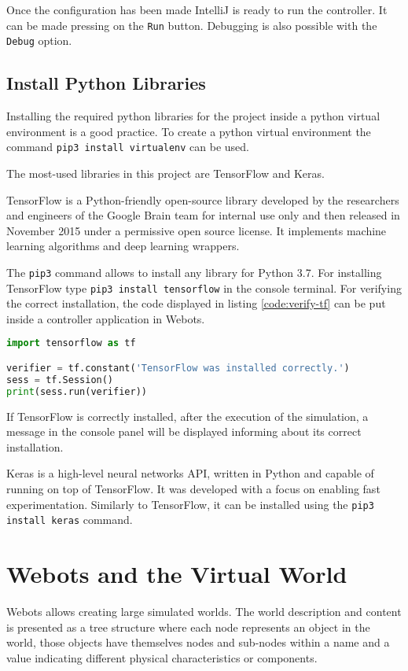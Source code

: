 Once the configuration has been made IntelliJ is ready to run the controller. It can be made pressing on the \verb|Run| button. Debugging is also possible with the \verb|Debug| option.

\subsection{Install Python Libraries}

Installing the required python libraries for the project inside a python virtual environment is a good practice. To create a python virtual environment the command \verb|pip3 install virtualenv| can be used. 

The most-used libraries in this project are TensorFlow and Keras. 

TensorFlow is a Python-friendly open-source library developed by the researchers and engineers of the Google Brain team for internal use only and  then released in November 2015 under a permissive open source license. It implements machine learning algorithms and deep learning wrappers\cite{Raschka:2015:PML:2886323}.

The \verb|pip3| command allows to install any library for Python 3.7. For installing TensorFlow type \verb|pip3 install tensorflow| in the console terminal. For verifying the correct installation, the code displayed in listing \ref{code:verify-tf} can be put inside a controller application in Webots.

\begin{lstlisting}[language=Python, caption=Verify correct installation of TensorFlow, label=code:verify-tf]
import tensorflow as tf

verifier = tf.constant('TensorFlow was installed correctly.')
sess = tf.Session()
print(sess.run(verifier))
\end{lstlisting}

If TensorFlow is correctly installed, after the execution of the simulation, a message in the console panel will be displayed informing about its correct installation.

Keras is a high-level neural networks API, written in Python and capable of running on top of TensorFlow. It was developed with a focus on enabling fast experimentation\cite{kerasURL}. Similarly to TensorFlow, it can be installed using the \verb|pip3 install keras| command.

\section{Webots and the Virtual World}
Webots allows creating large simulated worlds. The world description and content is presented as a tree structure where each node represents an object in the world, those objects have themselves nodes and sub-nodes within a name and a value indicating different physical characteristics or components. 

